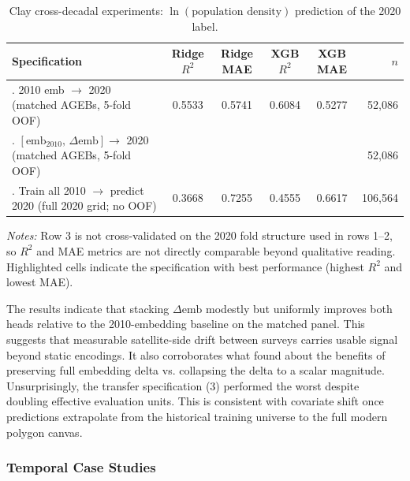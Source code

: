 \documentclass[12pt,letterpaper]{article}
\begin{document}
\begin{table}[H]
  \centering
  \caption{Clay cross-decadal experiments: $\ln(\text{population density})$ prediction of the 2020 label.}
  \label{tab:clay_temporal_cross_year}
  \footnotesize
  \renewcommand{\arraystretch}{1.15}
  \setlength{\tabcolsep}{4pt}
  
  \begin{tabularx}{\textwidth}{@{} >{\raggedright\arraybackslash}X cccc r @{}}
    \toprule
    \textbf{Specification} & \textbf{Ridge $R^2$} & \textbf{Ridge MAE} & \textbf{XGB $R^2$} & \textbf{XGB MAE} & \textbf{$n$} \\
    \midrule
    1. 2010 emb $\to$ 2020 (matched AGEBs, 5-fold OOF) & 0.5533 & 0.5741 & 0.6084 & 0.5277 & 52,086 \\
    \addlinespace[4pt]
    2. $[\mathrm{emb}_{2010},\,\Delta\mathrm{emb}] \to$ 2020 (matched AGEBs, 5-fold OOF) & \cellcolor{teal!15}{0.6121} & \cellcolor{teal!15}{0.5299} & \cellcolor{teal!15}{0.6389} & \cellcolor{teal!15}{0.5036} & 52,086 \\
    \addlinespace[4pt]
    3. Train all 2010 $\to$ predict 2020 (full 2020 grid; no OOF) & 0.3668 & 0.7255 & 0.4555 & 0.6617 & 106,564 \\
    \bottomrule
  \end{tabularx}
  \medskip
  \raggedright
  \textit{Notes:} Row 3 is not cross-validated on the 2020 fold structure used in rows 1--2, so $R^2$ and MAE metrics are not directly comparable beyond qualitative reading. \colorbox{teal!15}{Highlighted} cells indicate the specification with best performance (highest $R^2$ and lowest MAE).
\end{table}

The results indicate that stacking $\Delta\mathrm{emb}$ modestly but uniformly improves both heads relative to the 2010-embedding baseline on the matched panel. This suggests that measurable satellite-side drift between surveys carries usable signal beyond static encodings. It also corroborates what \textcite{Burns2026} found about the benefits of preserving full embedding delta vs. collapsing the delta to a scalar magnitude. Unsurprisingly, the transfer specification (3) performed the worst despite doubling effective evaluation units. This is consistent with covariate shift once predictions extrapolate from the historical training universe to the full modern polygon canvas.

\subsubsection{Temporal Case Studies}
\label{sub:temporal_case_studies}
\end{document}
